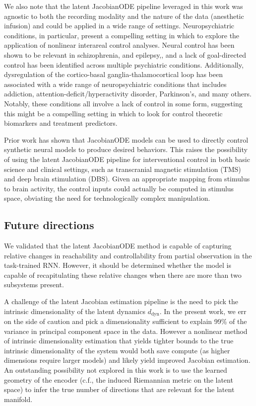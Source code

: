  We also note that the latent JacobianODE pipeline leveraged in this work was agnostic to both the recording modality and the nature of the data (anesthetic infusion) and could be applied in a wide range of settings. Neuropsychiatric conditions, in particular, present a compelling setting in which to explore the application of nonlinear interareal control analyses. Neural control has been shown to be relevant in schizophrenia,\cite{Li2023-zg, Mahadevan2023-bw,Zoller2021-ib} and epilepsy,\cite{He2022-fp}, and a lack of goal-directed control has been identified across multiple psychiatric conditions.\cite{Gillan2016-fm} Additionally, dysregulation of the cortico-basal ganglia-thalamocortical loop has been associated with a wide range of neuropsychiatric conditions that includes addiction, attention-deficit/hyperactivity disorder, Parkinson’s, and many others.\cite{Redish2004-jw, Frank2007-dx, Maia2011-ca} Notably, these conditions all involve a lack of control in some form, suggesting this might be a compelling setting in which to look for control theoretic biomarkers and treatment predictors.

 Prior work has shown that JacobianODE models can be used to directly control synthetic neural models to produce desired behaviors.\cite{Eisen2025-wt} This raises the possibility of using the latent JacobianODE pipeline for interventional control in both basic science and clinical settings, such as transcranial magnetic stimulation (TMS) and deep brain stimulation (DBS).\cite{Siddiqi2020-en, Siddiqi2024-su, Krauss2021-iv,Tiruvadi2022-bj,Alagapan2023-yd} Given an appropriate mapping from stimulus to brain activity, the control inputs could actually be computed in stimulus space, obviating the need for technologically complex manipulation.\cite{Bashivan2019-yv}

\subsection{Future directions}

We validated that the latent JacobianODE method is capable of capturing relative changes in reachability and controllability from partial observation in the task-trained RNN. However, it should be determined whether the model is capable of recapitulating these relative changes when there are more than two subsystems present.

A challenge of the latent Jacobian estimation pipeline is the need to pick the intrinsic dimensionality of the latent dynamics $d_{\text{dyn}}$. In the present work, we err on the side of caution and pick a dimensionality sufficient to explain 99\% of the variance in principal component space in the data. However a nonlinear method of intrinsic dimensionality estimation that yields tighter bounds to the true intrinsic dimensionality of the system would both save compute (as higher dimensions require larger models) and likely yield improved Jacobian estimation. An outstanding possibility not explored in this work is to use the learned geometry of the encoder (c.f., the induced Riemannian metric on the latent space) to infer the true number of directions that are relevant for the latent manifold.

